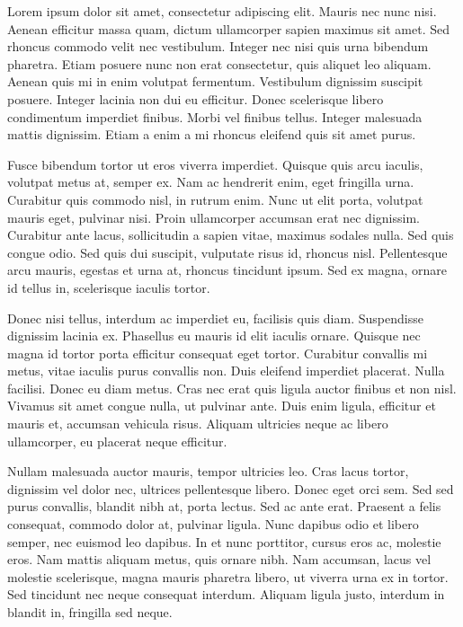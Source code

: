 Lorem ipsum dolor sit amet, consectetur adipiscing elit. Mauris nec nunc nisi. Aenean efficitur massa quam, dictum ullamcorper sapien maximus sit amet. Sed rhoncus commodo velit nec vestibulum. Integer nec nisi quis urna bibendum pharetra. Etiam posuere nunc non erat consectetur, quis aliquet leo aliquam. Aenean quis mi in enim volutpat fermentum. Vestibulum dignissim suscipit posuere. Integer lacinia non dui eu efficitur. Donec scelerisque libero condimentum imperdiet finibus. Morbi vel finibus tellus. Integer malesuada mattis dignissim. Etiam a enim a mi rhoncus eleifend quis sit amet purus.

Fusce bibendum tortor ut eros viverra imperdiet. Quisque quis arcu iaculis, volutpat metus at, semper ex. Nam ac hendrerit enim, eget fringilla urna. Curabitur quis commodo nisl, in rutrum enim. Nunc ut elit porta, volutpat mauris eget, pulvinar nisi. Proin ullamcorper accumsan erat nec dignissim. Curabitur ante lacus, sollicitudin a sapien vitae, maximus sodales nulla. Sed quis congue odio. Sed quis dui suscipit, vulputate risus id, rhoncus nisl. Pellentesque arcu mauris, egestas et urna at, rhoncus tincidunt ipsum. Sed ex magna, ornare id tellus in, scelerisque iaculis tortor.

Donec nisi tellus, interdum ac imperdiet eu, facilisis quis diam. Suspendisse dignissim lacinia ex. Phasellus eu mauris id elit iaculis ornare. Quisque nec magna id tortor porta efficitur consequat eget tortor. Curabitur convallis mi metus, vitae iaculis purus convallis non. Duis eleifend imperdiet placerat. Nulla facilisi. Donec eu diam metus. Cras nec erat quis ligula auctor finibus et non nisl. Vivamus sit amet congue nulla, ut pulvinar ante. Duis enim ligula, efficitur et mauris et, accumsan vehicula risus. Aliquam ultricies neque ac libero ullamcorper, eu placerat neque efficitur.

Nullam malesuada auctor mauris, tempor ultricies leo. Cras lacus tortor, dignissim vel dolor nec, ultrices pellentesque libero. Donec eget orci sem. Sed sed purus convallis, blandit nibh at, porta lectus. Sed ac ante erat. Praesent a felis consequat, commodo dolor at, pulvinar ligula. Nunc dapibus odio et libero semper, nec euismod leo dapibus. In et nunc porttitor, cursus eros ac, molestie eros. Nam mattis aliquam metus, quis ornare nibh. Nam accumsan, lacus vel molestie scelerisque, magna mauris pharetra libero, ut viverra urna ex in tortor. Sed tincidunt nec neque consequat interdum. Aliquam ligula justo, interdum in blandit in, fringilla sed neque.


